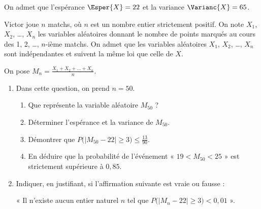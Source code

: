 \smallskip

On admet que l'espérance $\Esper{X}=22$ et la variance $\Varianc{X}=65$.

\smallskip

Victor joue $n$ matchs, où $n$ est un nombre entier strictement positif.
On note $X_{1}$, $X_{2}$, \ldots, $X_{n}$ les variables aléatoires donnant le nombre de points marqués au cours des 1, 2, \ldots, $n$-ième matchs. On admet que les variables aléatoires $X_{1}$, $X_{2}$, \ldots, $X_{n}$ sont indépendantes et suivent la même loi que celle de $X$.

\smallskip

On pose $M_{n}=\frac{X_{1}+X_{2}+\ldots+X_{n}}{n}$.

\begin{enumerate}
	\item Dans cette question, on prend $n=50$.
	\begin{enumerate}
		\item Que représente la variable aléatoire $M_{50}$ ?
		\item Déterminer l'espérance et la variance de $M_{50}$.
		\item Démontrer que $P\big(\left|M_{50}-22\right| \geqslant 3\big) \leqslant \frac{13}{90}$.
		\item En déduire que la probabilité de l'événement « $19 < M_{50} < 25$ » est strictement supérieure à $0,85$.
	\end{enumerate}
	\item Indiquer, en justifiant, si l'affirmation suivante est vraie ou fausse :
	
	« Il n'existe aucun entier naturel $n$ tel que $P\big(\left|M_{n}-22\right| \geqslant 3\big)< 0,01$ ».
\end{enumerate}